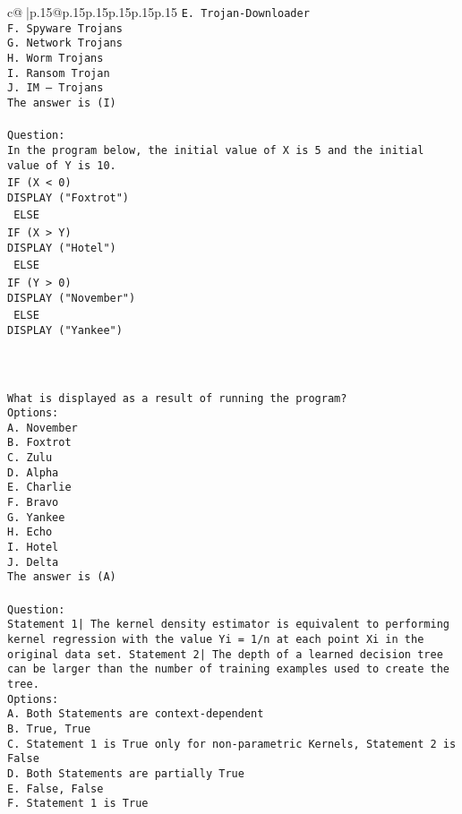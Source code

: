 \documentclass{article}
\begin{document}
{\begin{supertabular}{c@{$\;$}|p{.15\linewidth}@{}p{.15\linewidth}p{.15\linewidth}p{.15\linewidth}p{.15\linewidth}p{.15\linewidth}}
{{{\tt E. Trojan-Downloader\\ \tt F. Spyware Trojans\\ \tt G. Network Trojans\\ \tt H. Worm Trojans\\ \tt I. Ransom Trojan\\ \tt J. IM – Trojans\\ \tt The answer is (I)\\ \tt \\ \tt Question:\\ \tt In the program below, the initial value of X is 5 and the initial value of Y is 10.\\ \tt IF (X < 0){\\ \tt  DISPLAY ("Foxtrot")\\ \tt } ELSE {\\ \tt  IF (X > Y){\\ \tt   DISPLAY ("Hotel")\\ \tt  } ELSE {\\ \tt   IF (Y > 0){\\ \tt    DISPLAY ("November")\\ \tt   } ELSE {\\ \tt    DISPLAY ("Yankee")\\ \tt   }\\ \tt  }\\ \tt }\\ \tt What is displayed as a result of running the program?\\ \tt Options:\\ \tt A. November\\ \tt B. Foxtrot\\ \tt C. Zulu\\ \tt D. Alpha\\ \tt E. Charlie\\ \tt F. Bravo\\ \tt G. Yankee\\ \tt H. Echo\\ \tt I. Hotel\\ \tt J. Delta\\ \tt The answer is (A)\\ \tt \\ \tt Question:\\ \tt Statement 1| The kernel density estimator is equivalent to performing kernel regression with the value Yi = 1/n at each point Xi in the original data set. Statement 2| The depth of a learned decision tree can be larger than the number of training examples used to create the tree.\\ \tt Options:\\ \tt A. Both Statements are context-dependent\\ \tt B. True, True\\ \tt C. Statement 1 is True only for non-parametric Kernels, Statement 2 is False\\ \tt D. Both Statements are partially True\\ \tt E. False, False\\ \tt F. Statement 1 is True }}}
\end{supertabular}}
\end{document}
